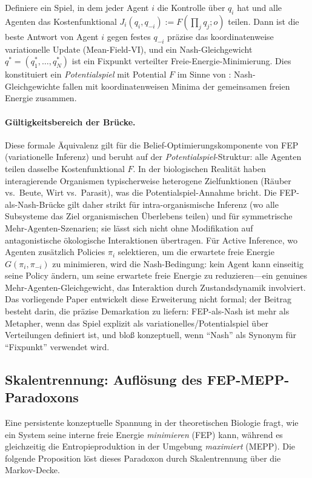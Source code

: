 \documentclass[12pt,a4paper]{article}
\theoremstyle{remark}
\begin{document}
Definiere ein Spiel, in dem jeder Agent $i$ die Kontrolle \"uber $q_i$ hat und alle Agenten das Kostenfunktional $J_i(q_i, q_{-i}) := F(\prod_j q_j; o)$ teilen. Dann ist die beste Antwort von Agent $i$ gegen festes $q_{-i}$ pr\"azise das koordinatenweise variationelle Update (Mean-Field-VI), und ein Nash-Gleichgewicht $q^* = (q_1^*, \dots, q_N^*)$ ist ein Fixpunkt verteilter Freie-Energie-Minimierung. Dies konstituiert ein \emph{Potentialspiel} mit Potential $F$ im Sinne von \citet{MondererShapley1996}: Nash-Gleichgewichte fallen mit koordinatenweisen Minima der gemeinsamen freien Energie zusammen.

\paragraph{G\"ultigkeitsbereich der Br\"ucke.} Diese formale \"Aquivalenz gilt f\"ur die Belief-Optimierungskomponente von FEP (variationelle Inferenz) und beruht auf der \emph{Potentialspiel}-Struktur: alle Agenten teilen dasselbe Kostenfunktional $F$. In der biologischen Realit\"at haben interagierende Organismen typischerweise heterogene Zielfunktionen (R\"auber vs.\ Beute, Wirt vs.\ Parasit), was die Potentialspiel-Annahme bricht. Die FEP-als-Nash-Br\"ucke gilt daher strikt f\"ur intra-organismische Inferenz (wo alle Subsysteme das Ziel organismischen \"Uberlebens teilen) und f\"ur symmetrische Mehr-Agenten-Szenarien; sie l\"asst sich nicht ohne Modifikation auf antagonistische \"okologische Interaktionen \"ubertragen. F\"ur Active Inference, wo Agenten zus\"atzlich Policies $\pi_i$ selektieren, um die erwartete freie Energie $G(\pi_i, \pi_{-i})$ zu minimieren, wird die Nash-Bedingung: kein Agent kann einseitig seine Policy \"andern, um seine erwartete freie Energie zu reduzieren---ein genuines Mehr-Agenten-Gleichgewicht, das Interaktion durch Zustandsdynamik involviert. Das vorliegende Paper entwickelt diese Erweiterung nicht formal; der Beitrag besteht darin, die pr\"azise Demarkation zu liefern: FEP-als-Nash ist mehr als Metapher, wenn das Spiel explizit als variationelles/Potentialspiel \"uber Verteilungen definiert ist, und blo\ss{} konzeptuell, wenn ``Nash'' als Synonym f\"ur ``Fixpunkt'' verwendet wird.

\subsection{Skalentrennung: Aufl\"osung des FEP-MEPP-Paradoxons}
\label{sec:fep-mepp-paradox}

Eine persistente konzeptuelle Spannung in der theoretischen Biologie fragt, wie ein System seine interne freie Energie \emph{minimieren} (FEP) kann, w\"ahrend es gleichzeitig die Entropieproduktion in der Umgebung \emph{maximiert} (MEPP). Die folgende Proposition l\"ost dieses Paradoxon durch Skalentrennung \"uber die Markov-Decke.
\end{document}
